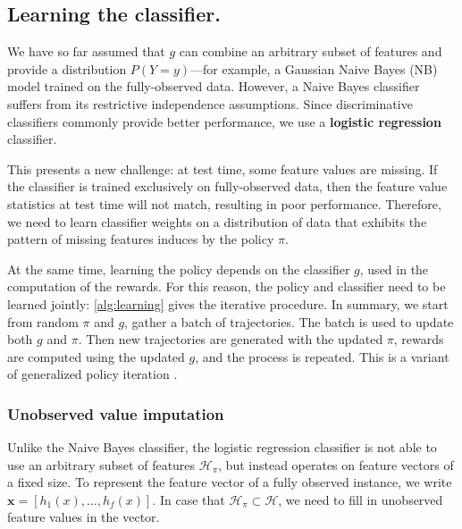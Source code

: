 \subsection{Learning the classifier.}\label{sec:classifier}

We have so far assumed that $g$ can combine an arbitrary subset of features and provide a distribution $P(Y = y)$---for example, a Gaussian Naive Bayes (NB) model trained on the fully-observed data.
However, a Naive Bayes classifier suffers from its restrictive independence assumptions.
Since discriminative classifiers commonly provide better performance, we use a \textbf{logistic regression} classifier.

This presents a new challenge: at test time, some feature values are missing.
If the classifier is trained exclusively on fully-observed data, then the feature value statistics at test time will not match, resulting in poor performance.
Therefore, we need to learn classifier weights on a distribution of data that exhibits the pattern of missing features induces by the policy $\pi$.



At the same time, learning the policy depends on the classifier $g$, used in the computation of the rewards.
For this reason, the policy and classifier need to be learned jointly: \autoref{alg:learning} gives the iterative procedure.
In summary, we start from random $\pi$ and $g$, gather a batch of trajectories.
The batch is used to update both $g$ and $\pi$.
Then new trajectories are generated with the updated $\pi$, rewards are computed using the updated $g$, and the process is repeated.
This is a variant of generalized policy iteration \cite{Sutton1998}.

\subsubsection{Unobserved value imputation}

Unlike the Naive Bayes classifier, the logistic regression classifier is not able to use an arbitrary subset of features $\mathcal{H}_\pi$, but instead operates on feature vectors of a fixed size.
To represent the feature vector of a fully observed instance, we write $\mathbf{x} = [h_1(x), \dots, h_f(x)]$.
In case that $\mathcal{H}_\pi \subset \mathcal{H}$, we need to fill in unobserved feature values in the vector.

